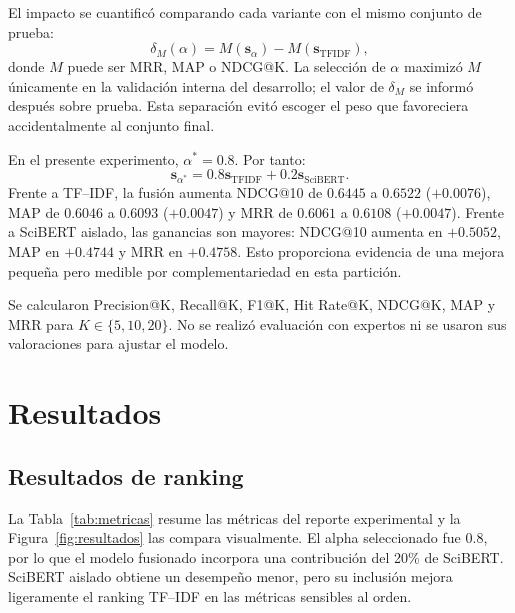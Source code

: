 \documentclass[12pt,a4paper]{article}
\begin{document}
El impacto se cuantificó comparando cada variante con el mismo conjunto de prueba:
\begin{equation}
\delta_M(\alpha)=M(\mathbf{s}_{\alpha})-M(\mathbf{s}_{\mathrm{TFIDF}}),
\end{equation}
\noindent donde $M$ puede ser MRR, MAP o NDCG@K. La selección de $\alpha$ maximizó $M$ únicamente en la validación interna del desarrollo; el valor de $\delta_M$ se informó después sobre prueba. Esta separación evitó escoger el peso que favoreciera accidentalmente al conjunto final.

En el presente experimento, $\alpha^*=0.8$. Por tanto:
\begin{equation}
\mathbf{s}_{\alpha^*}=0.8\mathbf{s}_{\mathrm{TFIDF}}+0.2\mathbf{s}_{\mathrm{SciBERT}}.
\end{equation}
Frente a TF--IDF, la fusión aumenta NDCG@10 de $0.6445$ a $0.6522$ ($+0.0076$), MAP de $0.6046$ a $0.6093$ ($+0.0047$) y MRR de $0.6061$ a $0.6108$ ($+0.0047$). Frente a SciBERT aislado, las ganancias son mayores: NDCG@10 aumenta en $+0.5052$, MAP en $+0.4744$ y MRR en $+0.4758$. Esto proporciona evidencia de una mejora pequeña pero medible por complementariedad en esta partición.

Se calcularon Precision@K, Recall@K, F1@K, Hit Rate@K, NDCG@K, MAP y MRR para $K\in\{5,10,20\}$. No se realizó evaluación con expertos ni se usaron sus valoraciones para ajustar el modelo.

\section{Resultados}

\subsection{Resultados de ranking}
La Tabla~\ref{tab:metricas} resume las métricas del reporte experimental y la Figura~\ref{fig:resultados} las compara visualmente. El alpha seleccionado fue $0.8$, por lo que el modelo fusionado incorpora una contribución del 20\% de SciBERT. SciBERT aislado obtiene un desempeño menor, pero su inclusión mejora ligeramente el ranking TF--IDF en las métricas sensibles al orden.
\end{document}
